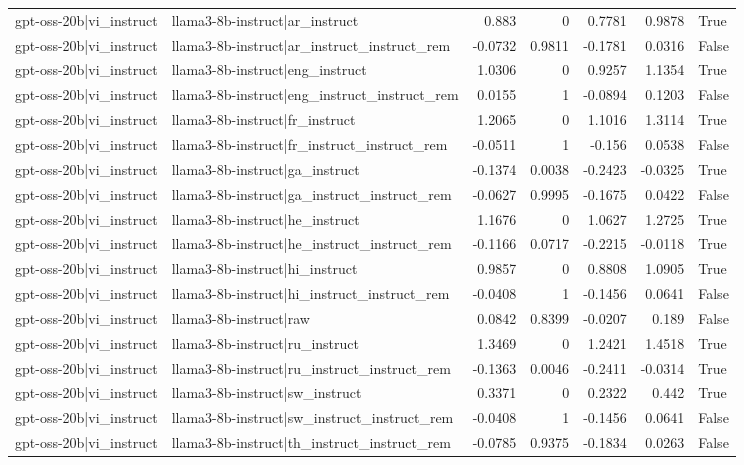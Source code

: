 \begin{table}
\begin{tabular}{l l r r r r l}
gpt-oss-20b|vi_instruct & llama3-8b-instruct|ar_instruct & 0.883 & 0 & 0.7781 & 0.9878 & True \\
gpt-oss-20b|vi_instruct & llama3-8b-instruct|ar_instruct_instruct_rem & -0.0732 & 0.9811 & -0.1781 & 0.0316 & False \\
gpt-oss-20b|vi_instruct & llama3-8b-instruct|eng_instruct & 1.0306 & 0 & 0.9257 & 1.1354 & True \\
gpt-oss-20b|vi_instruct & llama3-8b-instruct|eng_instruct_instruct_rem & 0.0155 & 1 & -0.0894 & 0.1203 & False \\
gpt-oss-20b|vi_instruct & llama3-8b-instruct|fr_instruct & 1.2065 & 0 & 1.1016 & 1.3114 & True \\
gpt-oss-20b|vi_instruct & llama3-8b-instruct|fr_instruct_instruct_rem & -0.0511 & 1 & -0.156 & 0.0538 & False \\
gpt-oss-20b|vi_instruct & llama3-8b-instruct|ga_instruct & -0.1374 & 0.0038 & -0.2423 & -0.0325 & True \\
gpt-oss-20b|vi_instruct & llama3-8b-instruct|ga_instruct_instruct_rem & -0.0627 & 0.9995 & -0.1675 & 0.0422 & False \\
gpt-oss-20b|vi_instruct & llama3-8b-instruct|he_instruct & 1.1676 & 0 & 1.0627 & 1.2725 & True \\
gpt-oss-20b|vi_instruct & llama3-8b-instruct|he_instruct_instruct_rem & -0.1166 & 0.0717 & -0.2215 & -0.0118 & True \\
gpt-oss-20b|vi_instruct & llama3-8b-instruct|hi_instruct & 0.9857 & 0 & 0.8808 & 1.0905 & True \\
gpt-oss-20b|vi_instruct & llama3-8b-instruct|hi_instruct_instruct_rem & -0.0408 & 1 & -0.1456 & 0.0641 & False \\
gpt-oss-20b|vi_instruct & llama3-8b-instruct|raw & 0.0842 & 0.8399 & -0.0207 & 0.189 & False \\
gpt-oss-20b|vi_instruct & llama3-8b-instruct|ru_instruct & 1.3469 & 0 & 1.2421 & 1.4518 & True \\
gpt-oss-20b|vi_instruct & llama3-8b-instruct|ru_instruct_instruct_rem & -0.1363 & 0.0046 & -0.2411 & -0.0314 & True \\
gpt-oss-20b|vi_instruct & llama3-8b-instruct|sw_instruct & 0.3371 & 0 & 0.2322 & 0.442 & True \\
gpt-oss-20b|vi_instruct & llama3-8b-instruct|sw_instruct_instruct_rem & -0.0408 & 1 & -0.1456 & 0.0641 & False \\
gpt-oss-20b|vi_instruct & llama3-8b-instruct|th_instruct_instruct_rem & -0.0785 & 0.9375 & -0.1834 & 0.0263 & False \\

\end{tabular}
\end{table}
